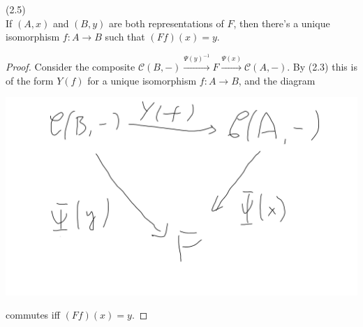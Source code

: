 \documentclass[a4paper]{article}
\begin{document}
\begin{coro} (2.5)\\
    If $(A,x)$ and $(B,y)$ are both representations of $F$, then there's a unique isomorphism $f:A \to B$ such that $(Ff)(x) = y$.
    \begin{proof}
        Consider the composite $\mathcal{C}(B,-) \xrightarrow{\Psi(y)^{-1}}F \xrightarrow{\Psi(x)} \mathcal{C}(A,-)$. By (2.3) this is of the form $Y(f)$ for a unique isomorphism $f:A \to B$, and the diagram

        \includegraphics[scale=0.5]{image/Cat_01.png}

        commutes iff $(Ff)(x) = y$.
    \end{proof}
\end{coro}
\end{document}
